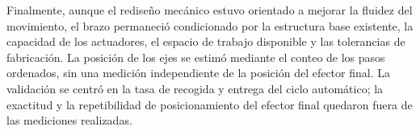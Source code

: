 Finalmente, aunque el rediseño mecánico estuvo orientado a mejorar la fluidez del movimiento, el brazo permaneció condicionado por la estructura base existente, la capacidad de los actuadores, el espacio de trabajo disponible y las tolerancias de fabricación. La posición de los ejes se estimó mediante el conteo de los pasos ordenados, sin una medición independiente de la posición del efector final. La validación se centró en la tasa de recogida y entrega del ciclo automático; la exactitud y la repetibilidad de posicionamiento del efector final quedaron fuera de las mediciones realizadas.
